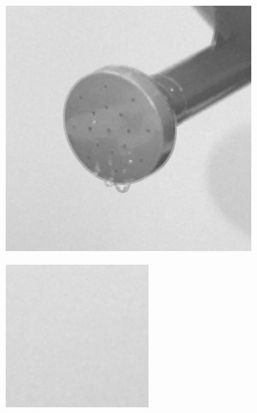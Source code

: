 \begin{figure}[H]
    \begin{subfigure}[b]{0.24\textwidth}
        \includegraphics[width=\textwidth]{img3/rect_5_midpoint_5_final_img3_add.png}
        \begin{center}
        	\text{ }
        \end{center}
        \includegraphics[width=\textwidth]{img3/rect_5_midpoint_5_final_img3.png}\\[0.1cm]

\end{subfigure}
\end{figure}
